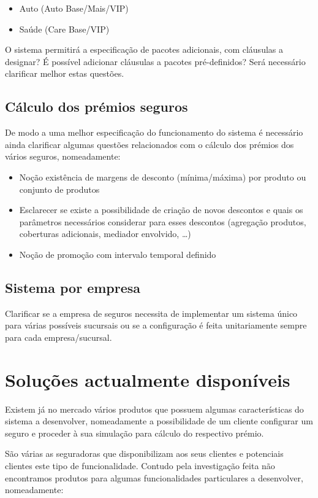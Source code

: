 \begin{itemize} 
\item Auto (Auto Base/Mais/VIP) 
\item Saúde (Care Base/VIP)
\end{itemize} 

O sistema permitirá a especificação de pacotes adicionais, com cláusulas a designar? É possível adicionar cláusulas a pacotes pré-definidos?
Será necessário clarificar melhor estas questões.

\subsection{Cálculo dos prémios seguros}
De modo a uma melhor especificação do funcionamento do sistema é necessário ainda clarificar algumas questões relacionados com o cálculo dos prémios dos vários seguros, nomeadamente:

\begin{itemize} 
\item Noção existência de margens de desconto (mínima/máxima) por produto ou conjunto de produtos
\item Esclarecer se existe a possibilidade de criação de novos descontos e quais os parâmetros necessários considerar para esses descontos (agregação produtos, coberturas adicionais, mediador envolvido, …)
\item Noção de promoção com intervalo temporal definido
\end{itemize} 

\subsection{Sistema por empresa}
Clarificar se a empresa de seguros necessita de implementar um sistema único para várias possíveis sucursais ou se a configuração é feita unitariamente sempre para cada empresa/sucursal.

\section{Soluções actualmente disponíveis}

Existem já no mercado vários produtos que possuem algumas características do sistema a desenvolver, nomeadamente a possibilidade de um cliente configurar um seguro e proceder à sua simulação para cálculo do respectivo prémio.

São várias as seguradoras que disponibilizam aos seus clientes e potenciais clientes este tipo de funcionalidade. Contudo pela investigação feita não encontramos produtos para algumas funcionalidades particulares a desenvolver, nomeadamente:

